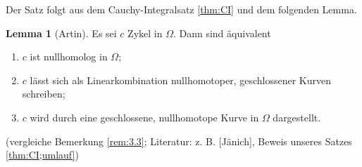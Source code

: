 \documentclass[11pt,titlepage]{article}
\theoremstyle{definition}
\newtheorem{lemma}[theorem]{Lemma}
\theoremstyle{remark}
\begin{document}
	Der Satz folgt aus dem Cauchy-Integralsatz \ref{thm:CI} und dem folgenden Lemma.
	
	\begin{lemma}[Artin]
		Es sei $c$ Zykel in $\Omega$. Dann sind äquivalent
		\begin{enumerate}
			\item $c$ ist nullhomolog in $\Omega$; \label{artin1}
			\item $c$ lässt sich als Linearkombination nullhomotoper, geschlossener Kurven schreiben; 
			\label{artin2}
			\item $c$ wird durch eine geschlossene, nullhomotope Kurve in $\Omega$ dargestellt. 
			\label{artin3}
		\end{enumerate}
		(vergleiche Bemerkung \ref{rem:3.3}; Literatur: z. B. [Jänich], Beweis unseres Satzes 
		\ref{thm:CI;umlauf})
	\end{lemma}
	
\end{document}
